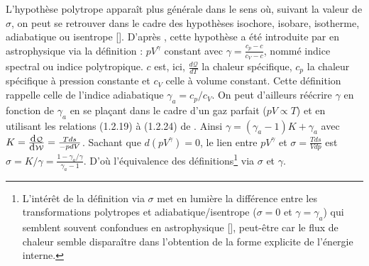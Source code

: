 L'hypothèse polytrope apparaît plus générale dans le sens où, suivant la valeur de $\sigma$, on peut se retrouver dans le cadre des hypothèses isochore, isobare, isotherme, adiabatique ou isentrope [\cite{borel_thermodynamique_2005}]. D'après \cite{horedt_polytropes_2004}, cette hypothèse a été introduite par \cite{chandrasekhar_introduction_1939} en astrophysique via la définition : $pV^{\gamma}$ constant avec $\gamma = \frac{c_p - c}{c_V - c}$, nommé indice spectral ou indice polytropique. $c$ est, ici, $\frac{d\mathcal{Q}}{dT}$ la chaleur spécifique, $c_p$ la chaleur spécifique à pression constante et $c_V$ celle à volume constant. Cette définition rappelle celle de l'indice adiabatique $\gamma_a = c_p/c_V$. On peut d'ailleurs réécrire $\gamma$ en fonction de $\gamma_a$ en se plaçant dans le cadre d'un gaz parfait ($pV \propto T$) et en utilisant les relations (1.2.19) à (1.2.24) de \cite{horedt_polytropes_2004}. Ainsi $\gamma = \left(\gamma_a - 1\right) K + \gamma_a$ avec $K = \frac{\dj  \mathcal{Q}}{\dj \mathcal{W}} = \frac{Tds}{-pdV}$. Sachant que $d\left(pV^{\gamma}\right) = 0$, le lien entre $pV^{\gamma}$ et $\sigma = \frac{Tds}{Vdp}$ est $\sigma = K/\gamma = \frac{1-\gamma_a/\gamma}{\gamma_a-1}$. D'où l'équivalence des définitions\footnote{L'intérêt de la définition via $\sigma$ met en lumière la différence entre les transformations polytropes et adiabatique/isentrope ($\sigma = 0 $ et $\gamma = \gamma_a$) qui semblent souvent confondues en astrophysique [\cite{eyink_cascades_2018}], peut-être car le flux de chaleur semble \og disparaître \fg{} dans l'obtention de la forme explicite de l'énergie interne.} via $\sigma$ et $\gamma$. 

